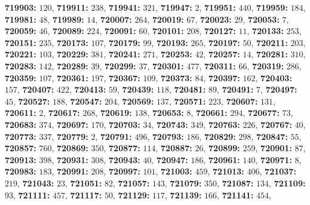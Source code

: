 \textsf{\bfseries 719903:} $120$, \textsf{\bfseries 719911:} $238$, \textsf{\bfseries 719941:} $321$, \textsf{\bfseries 719947:} $2$, \textsf{\bfseries 719951:} $440$, \textsf{\bfseries 719959:} $184$, \textsf{\bfseries 719981:} $48$, \textsf{\bfseries 719989:} $14$, \textsf{\bfseries 720007:} $264$, \textsf{\bfseries 720019:} $67$, \textsf{\bfseries 720023:} $29$, \textsf{\bfseries 720053:} $7$, \textsf{\bfseries 720059:} $46$, \textsf{\bfseries 720089:} $224$, \textsf{\bfseries 720091:} $60$, \textsf{\bfseries 720101:} $208$, \textsf{\bfseries 720127:} $11$, \textsf{\bfseries 720133:} $253$, \textsf{\bfseries 720151:} $235$, \textsf{\bfseries 720173:} $107$, \textsf{\bfseries 720179:} $99$, \textsf{\bfseries 720193:} $265$, \textsf{\bfseries 720197:} $50$, \textsf{\bfseries 720211:} $203$, \textsf{\bfseries 720221:} $103$, \textsf{\bfseries 720229:} $381$, \textsf{\bfseries 720241:} $271$, \textsf{\bfseries 720253:} $42$, \textsf{\bfseries 720257:} $14$, \textsf{\bfseries 720281:} $310$, \textsf{\bfseries 720283:} $142$, \textsf{\bfseries 720289:} $39$, \textsf{\bfseries 720299:} $37$, \textsf{\bfseries 720301:} $477$, \textsf{\bfseries 720311:} $66$, \textsf{\bfseries 720319:} $286$, \textsf{\bfseries 720359:} $107$, \textsf{\bfseries 720361:} $197$, \textsf{\bfseries 720367:} $109$, \textsf{\bfseries 720373:} $84$, \textsf{\bfseries 720397:} $162$, \textsf{\bfseries 720403:} $157$, \textsf{\bfseries 720407:} $422$, \textsf{\bfseries 720413:} $59$, \textsf{\bfseries 720439:} $118$, \textsf{\bfseries 720481:} $89$, \textsf{\bfseries 720491:} $7$, \textsf{\bfseries 720497:} $45$, \textsf{\bfseries 720527:} $188$, \textsf{\bfseries 720547:} $204$, \textsf{\bfseries 720569:} $137$, \textsf{\bfseries 720571:} $223$, \textsf{\bfseries 720607:} $131$, \textsf{\bfseries 720611:} $2$, \textsf{\bfseries 720617:} $268$, \textsf{\bfseries 720619:} $138$, \textsf{\bfseries 720653:} $8$, \textsf{\bfseries 720661:} $294$, \textsf{\bfseries 720677:} $73$, \textsf{\bfseries 720683:} $374$, \textsf{\bfseries 720697:} $170$, \textsf{\bfseries 720703:} $34$, \textsf{\bfseries 720743:} $349$, \textsf{\bfseries 720763:} $226$, \textsf{\bfseries 720767:} $40$, \textsf{\bfseries 720773:} $337$, \textsf{\bfseries 720779:} $2$, \textsf{\bfseries 720791:} $496$, \textsf{\bfseries 720793:} $186$, \textsf{\bfseries 720829:} $298$, \textsf{\bfseries 720847:} $55$, \textsf{\bfseries 720857:} $760$, \textsf{\bfseries 720869:} $350$, \textsf{\bfseries 720877:} $114$, \textsf{\bfseries 720887:} $26$, \textsf{\bfseries 720899:} $259$, \textsf{\bfseries 720901:} $87$, \textsf{\bfseries 720913:} $398$, \textsf{\bfseries 720931:} $308$, \textsf{\bfseries 720943:} $40$, \textsf{\bfseries 720947:} $186$, \textsf{\bfseries 720961:} $140$, \textsf{\bfseries 720971:} $8$, \textsf{\bfseries 720983:} $183$, \textsf{\bfseries 720991:} $208$, \textsf{\bfseries 720997:} $101$, \textsf{\bfseries 721003:} $459$, \textsf{\bfseries 721013:} $406$, \textsf{\bfseries 721037:} $219$, \textsf{\bfseries 721043:} $23$, \textsf{\bfseries 721051:} $82$, \textsf{\bfseries 721057:} $143$, \textsf{\bfseries 721079:} $350$, \textsf{\bfseries 721087:} $134$, \textsf{\bfseries 721109:} $93$, \textsf{\bfseries 721111:} $457$, \textsf{\bfseries 721117:} $50$, \textsf{\bfseries 721129:} $117$, \textsf{\bfseries 721139:} $166$, \textsf{\bfseries 721141:} $454$, 
